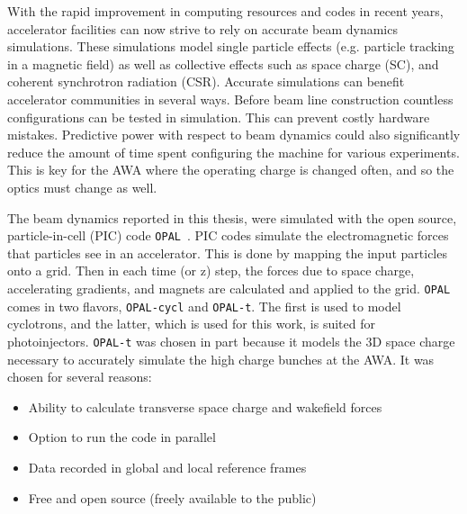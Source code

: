   \label{simulations}
\label{sec:code}

With the rapid improvement in computing resources and codes in recent years,  
accelerator facilities can now strive to rely on accurate beam dynamics simulations. 
These simulations model single particle effects 
(e.g. particle tracking in a magnetic field) as well as collective effects such as space charge (SC),  
and coherent synchrotron radiation (CSR).
Accurate simulations can benefit accelerator communities in several ways.
Before beam line construction countless configurations can be tested in simulation.
This can prevent costly hardware mistakes. 
Predictive power with respect to beam dynamics could also significantly reduce the amount of time 
spent configuring the machine for various experiments. This is key for the AWA
where the operating charge is changed often, and so the optics must change as well.

The beam dynamics reported in this thesis, were simulated with 
the open source, particle-in-cell (PIC) code \verb|OPAL|~\cite{opal}. 
PIC codes simulate the electromagnetic forces that particles see in an accelerator. 
This is done by mapping the input particles onto a grid. 
Then in each time (or z) step, the forces due to space charge, accelerating gradients, 
and magnets are calculated and applied to the grid.
\verb|OPAL| comes in two flavors, \verb|OPAL-cycl| and \verb|OPAL-t|. The first is used to model 
cyclotrons, and the latter, which is used for this work, is suited for photoinjectors. 
\verb|OPAL-t| was chosen in part because it models the 3D space charge necessary to accurately simulate the high charge bunches at the AWA. 
It was chosen for several reasons:
\begin{itemize}
	\item Ability to calculate transverse space charge and wakefield forces 
	\item Option to run the code in parallel
	\item Data recorded in global and local reference frames 
	\item Free and open source (freely available to the public)
\end{itemize} 

